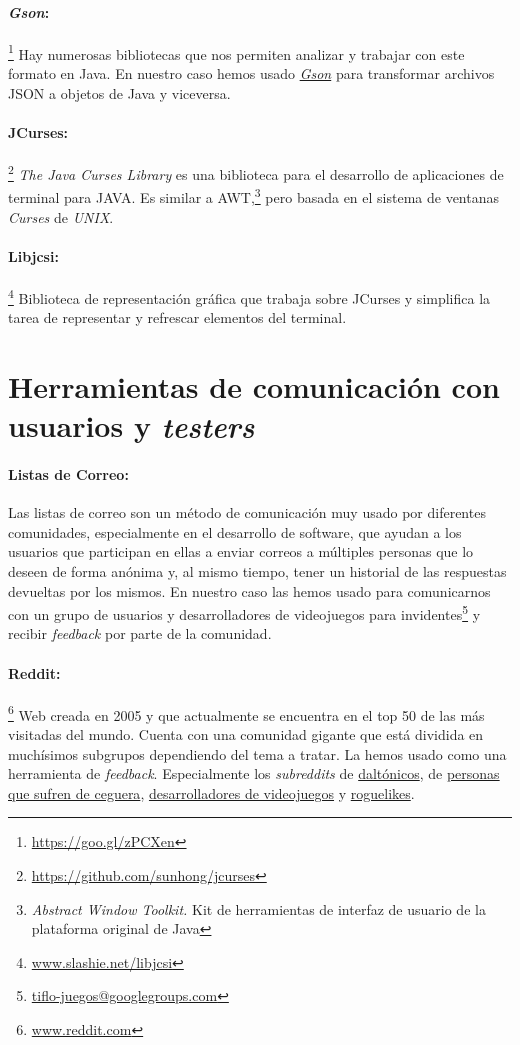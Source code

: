 \paragraph{\textit{Gson}:}\footnote{\url{https://goo.gl/zPCXen}} Hay numerosas bibliotecas que nos permiten analizar y trabajar con este formato en Java. En nuestro caso hemos usado \href{https://goo.gl/zPCXen}{\textit{Gson}} para transformar archivos JSON a objetos de Java y viceversa.

\paragraph{JCurses:}\footnote{\url{https://github.com/sunhong/jcurses}} \textit{The Java Curses Library} es una biblioteca para el desarrollo de aplicaciones de terminal para JAVA. Es similar a AWT,\footnote{\textit{Abstract Window Toolkit.} Kit de herramientas de interfaz de usuario de la plataforma original de Java} pero basada en el sistema de ventanas \textit{Curses} de \textit{UNIX}.

\paragraph{Libjcsi:}\footnote{\url{www.slashie.net/libjcsi}} Biblioteca de representación gráfica que trabaja sobre JCurses y simplifica la tarea de representar y refrescar elementos del terminal.

\section{Herramientas de comunicación con usuarios y \textit{testers}}

\paragraph{Listas de Correo:} Las listas de correo son un método de comunicación muy usado por diferentes comunidades, especialmente en el desarrollo de software, que ayudan a los usuarios que participan en ellas a enviar correos a múltiples personas que lo deseen de forma anónima y, al mismo tiempo, tener un historial de las respuestas devueltas por los mismos. En nuestro caso las hemos usado para comunicarnos con un grupo de usuarios y desarrolladores de videojuegos para invidentes\footnote{\url{tiflo-juegos@googlegroups.com}} y recibir \textit{feedback} por parte de la comunidad.

 \paragraph{Reddit:}\footnote{\url{www.reddit.com}} Web creada en 2005 y que actualmente se encuentra en el top 50 de las más visitadas del mundo. Cuenta con una comunidad gigante que está dividida en muchísimos subgrupos dependiendo del tema a tratar. La hemos usado como una herramienta de \textit{feedback}. Especialmente los \textit{subreddits} de \href{https://www.reddit.com/r/ColorBlind/}{daltónicos}, de \href{https://www.reddit.com/r/blind/}{personas que sufren de ceguera}, \href{https://www.reddit.com/r/gamedev/}{desarrolladores de videojuegos} y \href{https://www.reddit.com/r/roguelikes/}{roguelikes}.
